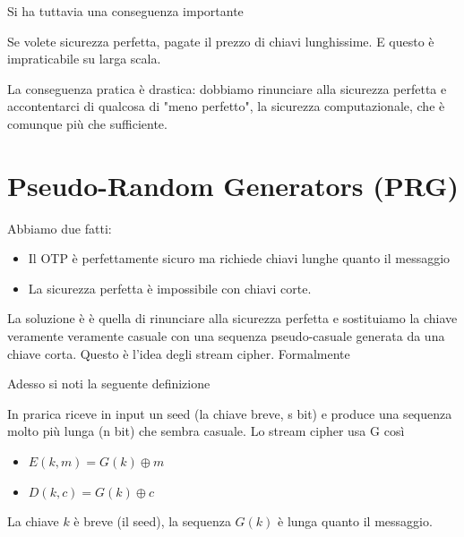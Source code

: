  Si ha tuttavia una conseguenza importante

Se volete sicurezza perfetta, pagate il prezzo di chiavi lunghissime. E questo è impraticabile su larga scala.

La conseguenza pratica è drastica: dobbiamo rinunciare alla sicurezza perfetta e accontentarci di qualcosa di "meno perfetto", la sicurezza computazionale, che è comunque più che sufficiente.

\section{Pseudo-Random Generators (PRG)}

Abbiamo due fatti:
\begin{itemize}
  \item Il OTP è perfettamente sicuro ma richiede chiavi lunghe quanto il messaggio
  \item La sicurezza perfetta è impossibile con chiavi corte.
\end{itemize}
La soluzione è è quella di rinunciare alla sicurezza perfetta e sostituiamo la chiave veramente veramente casuale con una sequenza pseudo-casuale generata da una chiave corta. Questo è l'idea degli stream cipher. Formalmente

Adesso si noti la seguente definizione

In prarica riceve in input un seed (la chiave breve, s bit) e produce una sequenza molto più lunga (n bit) che sembra casuale. Lo stream cipher usa G così
\begin{itemize}
  \item $E(k, m) = G(k) \oplus m$
  \item $D(k, c) = G(k) \oplus c$
\end{itemize}
La chiave $k$ è breve (il seed), la sequenza $G(k)$ è lunga quanto il messaggio.

